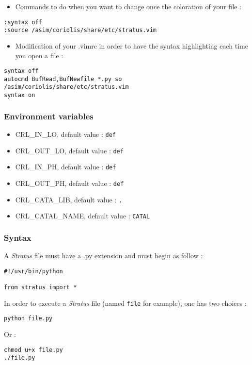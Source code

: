 \begin{itemize}
    \item Commands to do when you want to change once the coloration of your file :
\end{itemize}
\begin{small}
\begin{verbatim}
:syntax off
:source /asim/coriolis/share/etc/stratus.vim
\end{verbatim}
\end{small}
\begin{itemize}
    \item Modification of your .vimrc in order to have the syntax highlighting each time you open a file :
\end{itemize}
\begin{small}
\begin{verbatim}
syntax off
autocmd BufRead,BufNewfile *.py so /asim/coriolis/share/etc/stratus.vim
syntax on
\end{verbatim}
\end{small}
        
\subsubsection{Environment variables}

\begin{itemize}
    \item CRL\_IN\_LO, default value : \verb-def-
    \item CRL\_OUT\_LO, default value : \verb-def-
    \item CRL\_IN\_PH, default value : \verb-def-
    \item CRL\_OUT\_PH, default value : \verb-def-
    \item CRL\_CATA\_LIB, default value : \verb-.-
    \item CRL\_CATAL\_NAME, default value : \verb-CATAL-
\end{itemize}

\subsubsection{Syntax}

A \emph{Stratus} file must have a .py extension and must begin as follow :
\begin{verbatim}
#!/usr/bin/python

from stratus import *
\end{verbatim}

\indent In order to execute a \emph{Stratus} file (named \verb-file- for example), one has two choices :
\begin{verbatim}
python file.py
\end{verbatim}
\indent Or :
\begin{verbatim}
chmod u+x file.py
./file.py
\end{verbatim}

